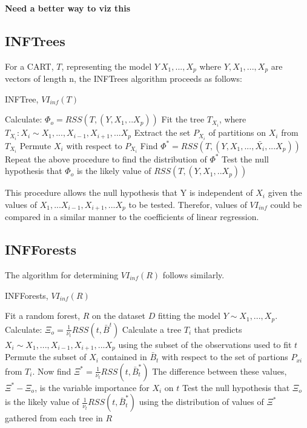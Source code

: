 \documentclass[12pt,twoside]{reedthesis}
\begin{document}
  \textbf{Need a better way to viz this}
  
  \subsection{INFTrees}\label{inftrees}
  
  For a CART, \(T\), representing the model \(Y~X_1,...,X_p\) where
  \(Y,X_1,...,X_p\) are vectors of length n, the INFTrees algorithm
  proceeds as follows:
  
  \begin{algorithm}
  \caption{INFTree, $VI_{inf}(T)$}
  \label{inftree}
  \begin{algorithmic}
  \State Calculate: $\Phi_o =  RSS(T, (Y,X_1,..X_p))$
  \State Fit the tree $T_{X_i}$, where $T_{X_i} : X_i \sim X_1,...,X_{i-1}, X_{i+1},...X_p$
  \State Extract the set $P_{X_i}$ of partitions on $X_i$ from $T_{X_i}$
  \State Permute $X_i$ with respect to $P_{X_i}$
  \State Find $\Phi^* =  RSS(T, (Y,X_1,..., \bar{X_i},...X_p))$
  \State Repeat the above procedure to find the distribution of $\Phi^*$
  \State Test the null hypothesis that $\Phi_o$ is the likely value of $RSS(T, (Y,X_1,..X_p))$
  \EndFor
  \end{algorithmic}
  \end{algorithm}
  
  This procedure allows the null hypothesis that Y is independent of
  \(X_i\) given the values of \(X_1,...X_{i-1},X_{i+1},...X_p\) to be
  tested. Therefor, values of \(VI_{inf}\) could be compared in a similar
  manner to the coefficients of linear regression.
  
  \subsection{INFForests}\label{infforests}
  
  The algorithm for determining \(VI_{inf}(R)\) follows similarly.
  
  \begin{algorithm}
  \caption{INFForests, $VI_{inf}(R)$}
  \label{infforest}
  \begin{algorithmic}[1]
  \State Fit a random forest, $R$ on the dataset $D$ fitting the model $Y \sim X_1,...,X_p$.
  \State Calculate: $\Xi_o =  \frac 1 {\nu_t} RSS(t,\bar{B}^t)$
  \State Calculate a tree $T_i$ that predicts $X_i \sim X_1,...,X_{i-1}, X_{i+1},...X_p$ using the subset of the observations used to fit $t$  
  \State Permute the subset of $X_i$ contained in $\bar{B}_t$ with respect to the set of partions $P_{xi}$ from $T_i$.
  \State Now find $\Xi^* =  \frac 1 {\nu_t} RSS(t,\bar{B}_t^*)$
  \State The difference between these values, $\Xi^* - \Xi_o$,  is the variable importance for $X_i$ on $t$
  \EndFor
  \State Test the null hypothesis that $\Xi_o$ is the likely value of $\frac 1 {\nu_t} RSS(t,\bar{B}_t^*)$ using the distribution of values of $\Xi^*$ gathered from each tree in $R$
  \EndFor
  \end{algorithmic}
  \end{algorithm}
  
\end{document}

